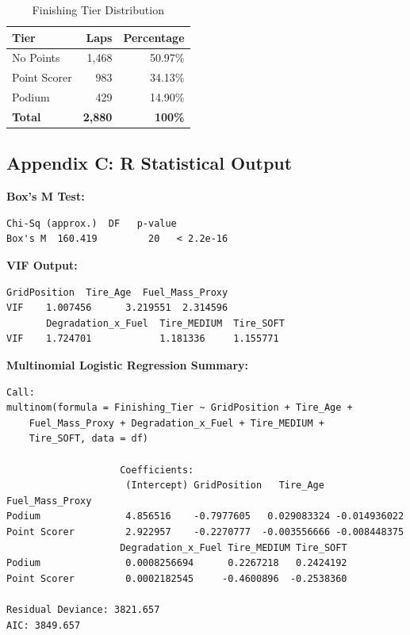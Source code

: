 \begin{table}[htbp]
  \centering
  \caption{Finishing Tier Distribution}
  \label{tab:class-dist}
  \begin{tabular}{lrr}
    \toprule
    \textbf{Tier} & \textbf{Laps} & \textbf{Percentage} \\
    \midrule
    No Points     & 1,468 & 50.97\% \\
    Point Scorer  &   983 & 34.13\% \\
    Podium        &   429 & 14.90\% \\
    \midrule
    \textbf{Total} & \textbf{2,880} & \textbf{100\%} \\
    \bottomrule
  \end{tabular}
\end{table}

\subsection{Appendix C: R Statistical Output}

\small
\textbf{Box's M Test:}
\begin{lstlisting}[basicstyle=\small\ttfamily,breaklines=true,breakatwhitespace=false]
       Chi-Sq (approx.)  DF   p-value
Box's M  160.419         20   < 2.2e-16
\end{lstlisting}

\textbf{VIF Output:}
\begin{lstlisting}[basicstyle=\small\ttfamily,breaklines=true,breakatwhitespace=false]
       GridPosition  Tire_Age  Fuel_Mass_Proxy
VIF    1.007456      3.219551  2.314596
       Degradation_x_Fuel  Tire_MEDIUM  Tire_SOFT
VIF    1.724701            1.181336     1.155771
\end{lstlisting}

\textbf{Multinomial Logistic Regression Summary:}
\begin{lstlisting}[basicstyle=\small\ttfamily,breaklines=true,breakatwhitespace=false]
Call:
multinom(formula = Finishing_Tier ~ GridPosition + Tire_Age +
    Fuel_Mass_Proxy + Degradation_x_Fuel + Tire_MEDIUM +
    Tire_SOFT, data = df)

                    Coefficients:
                     (Intercept) GridPosition   Tire_Age Fuel_Mass_Proxy
Podium               4.856516    -0.7977605   0.029083324 -0.014936022
Point Scorer         2.922957    -0.2270777  -0.003556666 -0.008448375
                    Degradation_x_Fuel Tire_MEDIUM Tire_SOFT
Podium               0.0008256694      0.2267218   0.2424192
Point Scorer         0.0002182545     -0.4600896  -0.2538360

Residual Deviance: 3821.657
AIC: 3849.657
\end{lstlisting}

